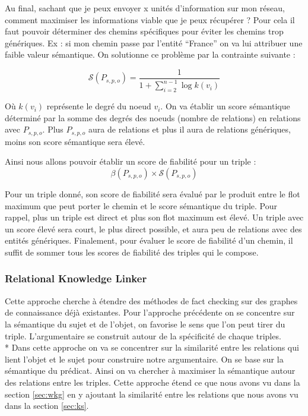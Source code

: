 Au final, sachant que je peux envoyer x unités d'information sur mon réseau, comment maximiser les informations viable que je peux récupérer ? Pour cela il faut pouvoir déterminer des chemins spécifiques pour éviter les chemins trop génériques. Ex : si mon chemin passe par l'entité \enquote{France} on va lui attribuer une faible valeur sémantique. On solutionne ce problème par la contrainte suivante :

\begin{equation}
   \mathcal{S}(P_{s,p,o}) = \frac{1}{1 + \sum\limits_{i=2}^{n-1} \log k(v_{i})}
\end{equation}

Où $ k(v_{i}) $ représente le degré du noeud $ v_{i} $. On va établir un score sémantique déterminé par la somme des degrés des noeuds (nombre de relations) en relations avec $ P_{s,p,o} $. Plus $ P_{s,p,o} $ aura de relations et plus il aura de relations génériques, moins son score sémantique sera élevé.

Ainsi nous allons pouvoir établir un score de fiabilité pour un triple :
\begin{equation}
   \beta(P_{s,p,o}) \times \mathcal{S}(P_{s,p,o})
\end{equation}

Pour un triple donné, son score de fiabilité sera évalué par le produit entre le flot maximum que peut porter le chemin et le score sémantique du triple. Pour rappel, plus un triple est direct et plus son flot maximum est élevé. Un triple avec un score élevé sera court, le plus direct possible, et aura peu de relations avec des entités génériques. Finalement, pour évaluer le score de fiabilité d'un chemin, il suffit de sommer tous les scores de fiabilité des triples qui le compose.

\subsubsection{Relational Knowledge Linker}

Cette approche cherche à étendre des méthodes de fact checking sur des graphes de connaissance déjà existantes.
Pour l'approche précédente on se concentre sur la sémantique du sujet et de l'objet, on favorise le sens que l'on peut tirer du triple. L'argumentaire se construit autour de la spécificité de chaque triples. 
\\*
Dans cette approche on va se concentrer sur la similarité entre les relations qui lient l'objet et le sujet pour construire notre argumentaire. On se base sur la sémantique du prédicat. Ainsi on va chercher à maximiser la sémantique autour des relations entre les triples. Cette approche étend ce que nous avons vu dans la section \ref{sec:wkg} en y ajoutant la similarité entre les relations que nous avons vu dans la section \ref{sec:ks}.

